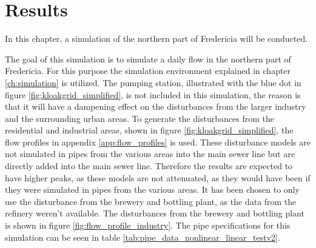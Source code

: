 \chapter{Results}\label{ch:results}
In this chapter, a simulation of the northern part of Fredericia will be conducted.

The goal of this simulation is to simulate a daily flow in the northern part of Fredericia. For this purpose the simulation environment explained in chapter \ref{ch:simulation} is utilized. The pumping station, illustrated with the blue dot in figure \ref{fig:kloakgrid_simplified}, is not included in this simulation, the reason is that it will have a dampening effect on the disturbances from the larger industry and the surrounding urban areas. To generate the disturbances from the residential and industrial areas, shown in figure \ref{fig:kloakgrid_simplified}, the flow profiles in appendix \ref{app:flow_profiles} is used. These disturbance models are not simulated in pipes from the various areas into the main sewer line but are directly added into the main sewer line. Therefore the results are expected to have higher peaks, as these models are not attenuated, as they would have been if they were simulated in pipes from the various areas. It has been chosen to only use the disturbance from the brewery and bottling plant, as the data from the refinery weren't available. The disturbances from the brewery and bottling plant is shown in figure \ref{fig:flow_profile_industry}. The pipe specifications for this simulation can be seen in table \ref{tab:pipe_data_nonlinear_linear_testv2}.  

